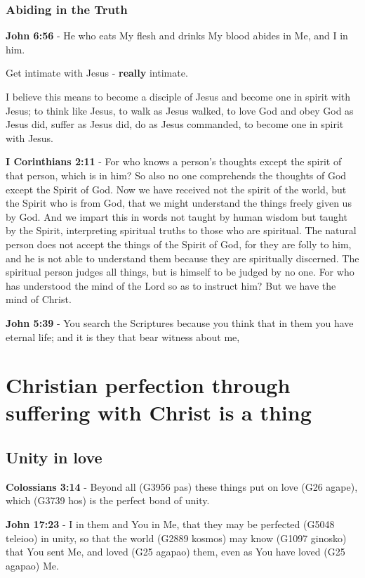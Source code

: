 \documentclass[11pt]{article}
\begin{document}
\subsubsection{Abiding in the Truth}
\label{sec:org7e5df3a}
\textbf{John 6:56} - He who eats My flesh and drinks My blood abides in Me, and I in him.

Get intimate with Jesus - \textbf{really} intimate.

I believe this means to become a disciple of Jesus and become one in spirit with Jesus; to think like Jesus, to walk as Jesus walked, to love God and obey God as Jesus did, suffer as Jesus did, do as Jesus commanded, to become one in spirit with Jesus.

\textbf{I Corinthians 2:11} - For who knows a person's thoughts except the spirit of that person, which is in him? So also no one comprehends the thoughts of God except the Spirit of God. Now we have received not the spirit of the world, but the Spirit who is from God, that we might understand the things freely given us by God. And we impart this in words not taught by human wisdom but taught by the Spirit, interpreting spiritual truths to those who are spiritual. The natural person does not accept the things of the Spirit of God, for they are folly to him, and he is not able to understand them because they are spiritually discerned. The spiritual person judges all things, but is himself to be judged by no one. For who has understood the mind of the Lord so as to instruct him? But we have the mind of Christ.

\textbf{John 5:39} - You search the Scriptures because you think that in them you have eternal life; and it is they that bear witness about me,

\section{Christian perfection through suffering with Christ is a thing}
\label{sec:orgc6e6839}
\subsection{Unity in love}
\label{sec:orgb8d3fe2}
\textbf{Colossians 3:14} - Beyond all (G3956 pas) these things put on love (G26 agape), which (G3739 hos) is the perfect bond of unity.

\textbf{John 17:23} - I in them and You in Me, that they may be perfected (G5048 teleioo) in unity, so that the world (G2889 kosmos) may know (G1097 ginosko) that You sent Me, and loved (G25 agapao) them, even as You have loved (G25 agapao) Me.
\end{document}

